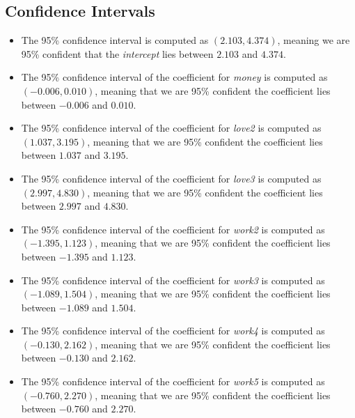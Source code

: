 \documentclass[11pt,letterpaper]{article}
\begin{document}
\subsection{Confidence Intervals}
\begin{itemize}
\item The 95\% confidence interval is computed as $\mathbf{(2.103,4.374)}$, meaning we are 95\% confident that the \emph{intercept} lies between $2.103$ and $4.374$.

\item The 95\% confidence interval of the coefficient for \emph{money} is computed as $\mathbf{(-0.006,0.010)}$, meaning that we are 95\% confident the coefficient lies between $-0.006$ and $0.010$.

\item The 95\% confidence interval of the coefficient for \emph{love2} is computed as $\mathbf{(1.037,3.195)}$, meaning that we are 95\% confident the coefficient lies between $1.037$ and $3.195$.

\item The 95\% confidence interval of the coefficient for \emph{love3} is computed as $\mathbf{(2.997,4.830)}$, meaning that we are 95\% confident the coefficient lies between $2.997$ and $4.830$.

\item The 95\% confidence interval of the coefficient for \emph{work2} is computed as $\mathbf{(-1.395,1.123)}$, meaning that we are 95\% confident the coefficient lies between $-1.395$ and $1.123$.

\item The 95\% confidence interval of the coefficient for \emph{work3} is computed as $\mathbf{(-1.089,1.504)}$, meaning that we are 95\% confident the coefficient lies between $-1.089$ and $1.504$.

\item The 95\% confidence interval of the coefficient for \emph{work4} is computed as $\mathbf{(-0.130,2.162)}$, meaning that we are 95\% confident the coefficient lies between $-0.130$ and $2.162$.

\item The 95\% confidence interval of the coefficient for \emph{work5} is computed as $\mathbf{(-0.760,2.270)}$, meaning that we are 95\% confident the coefficient lies between $-0.760$ and $2.270$.
\end{itemize}
\end{document}
